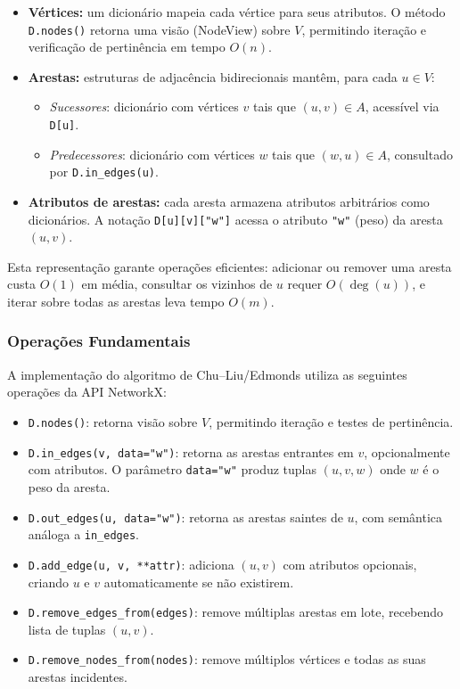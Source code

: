 \begin{itemize}\setlength{\itemsep}{2pt}
    \item \textbf{Vértices:} um dicionário mapeia cada vértice para seus atributos. O método \texttt{D.nodes()} retorna uma visão (NodeView) sobre \(V\), permitindo iteração e verificação de pertinência em tempo \(O(n)\).
    \item \textbf{Arestas:} estruturas de adjacência bidirecionais mantêm, para cada \(u\in V\):
          \begin{itemize}\setlength{\itemsep}{2pt}
              \item \emph{Sucessores}: dicionário com vértices \(v\) tais que \((u,v)\in A\), acessível via \texttt{D[u]}.
              \item \emph{Predecessores}: dicionário com vértices \(w\) tais que \((w,u)\in A\), consultado por \texttt{D.in\_edges(u)}.
          \end{itemize}
    \item \textbf{Atributos de arestas:} cada aresta armazena atributos arbitrários como dicionários. A notação \texttt{D[u][v]["w"]} acessa o atributo \texttt{"w"} (peso) da aresta \((u,v)\).
\end{itemize}

Esta representação garante operações eficientes: adicionar ou remover uma aresta custa \(O(1)\) em média, consultar os vizinhos de \(u\) requer \(O(\deg(u))\), e iterar sobre todas as arestas leva tempo \(O(m)\).

\subsubsection{Operações Fundamentais}

A implementação do algoritmo de Chu--Liu/Edmonds utiliza as seguintes operações da API NetworkX:

\begin{itemize}\setlength{\itemsep}{2pt}
    \item \texttt{D.nodes()}: retorna visão sobre \(V\), permitindo iteração e testes de pertinência.
    \item \texttt{D.in\_edges(v, data="w")}: retorna as arestas entrantes em \(v\), opcionalmente com atributos. O parâmetro \texttt{data="w"} produz tuplas \((u, v, w)\) onde \(w\) é o peso da aresta.
    \item \texttt{D.out\_edges(u, data="w")}: retorna as arestas saintes de \(u\), com semântica análoga a \texttt{in\_edges}.
    \item \texttt{D.add\_edge(u, v, **attr)}: adiciona \((u,v)\) com atributos opcionais, criando \(u\) e \(v\) automaticamente se não existirem.
    \item \texttt{D.remove\_edges\_from(edges)}: remove múltiplas arestas em lote, recebendo lista de tuplas \((u,v)\).
    \item \texttt{D.remove\_nodes\_from(nodes)}: remove múltiplos vértices e todas as suas arestas incidentes.
\end{itemize}

